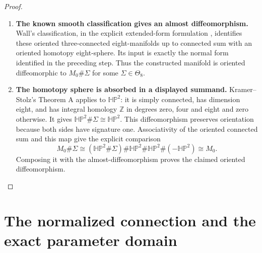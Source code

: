 \documentclass[11pt,a4paper]{article}
\theoremstyle{definition}
\begin{document}
\begin{proof}
\begin{enumerate}[label=\arabic*.]
\item \textbf{The known smooth classification gives an almost
diffeomorphism.}
Wall's classification, in the explicit extended-form formulation
\cite[Definition 3.6, pp.~12--13, and Theorem 3.7(1),
pp.~13--14]{IVVWallForm}, identifies these oriented
three-connected eight-manifolds up to connected sum with an
oriented homotopy eight-sphere.  Its input is exactly the normal
form identified in the preceding step.  Thus the constructed
manifold is oriented diffeomorphic to $M_0\#\Sigma$ for some
$\Sigma\in\Theta_8$.

\item \textbf{The homotopy sphere is absorbed in a displayed
summand.}
Kramer--Stolz's Theorem A
\cite[Theorem A, p.~178]{IVVKramerStolz} applies to
$\mathbb{HP}^2$: it is simply connected, has dimension eight,
and has integral homology $\mathbb Z$ in degrees zero, four
and eight and zero otherwise.  It gives
$\mathbb{HP}^2\#\Sigma\cong\mathbb{HP}^2$.
This diffeomorphism preserves orientation because both sides
have signature one.  Associativity of the oriented connected
sum and this map give the explicit comparison
\[
M_0\#\Sigma
\cong(\mathbb{HP}^2\#\Sigma)\#\mathbb{HP}^2
       \#\mathbb{HP}^2\#(-\mathbb{HP}^2)
\cong M_0.
\]
Composing it with the almost-diffeomorphism proves the claimed
oriented diffeomorphism.
\end{enumerate}
\end{proof}


\section{The normalized connection and the exact parameter domain}
\end{document}
